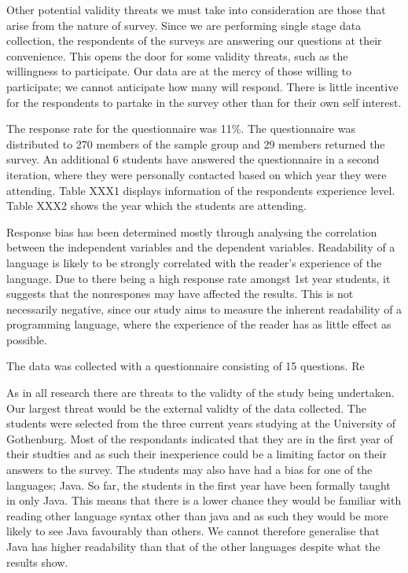\documentclass[times, 10pt,twocolumn]{IEEEtran}
\begin{document}
Other potential validity threats we must take into consideration are those that arise from the nature of survey. Since we are performing single stage data collection, the respondents of the surveys are answering our questions at their convenience. This opens the door for some validity threats, such as the willingness to participate. Our data are at the mercy of those willing to participate; we cannot anticipate how many will respond. There is little incentive for the respondents to partake in the survey other than for their own self interest.

The response rate for the questionnaire was 11\%. The questionnaire was distributed to 270 members of the sample group and 29 members returned the survey. An additional 6 students have answered the questionnaire in a second iteration, where they were personally contacted based on which year they were attending. Table XXX1 displays information of the respondents experience level. Table XXX2 shows the year which the students are attending. 
\newline

Response bias has been determined mostly through analysing the correlation between the independent variables and the dependent variables. Readability of a language is likely to be strongly correlated with the reader's experience of the language. Due to there being a high response rate amongst 1st year students, it suggests that the nonrespones may have affected the results. This is not necessarily negative, since our study aims to measure the inherent readability of a programming language, where the experience of the reader has as little effect as possible. 
\newline

The data was collected with a questionnaire consisting of 15 questions.
Re


As in all research there are threats to the validty of the study being undertaken. Our largest threat would be the external validty of the data collected. The students were selected from the three current years studying at the University of Gothenburg. Most of the respondants indicated that they are in the first year of their studties and as such their inexperience could be a limiting factor on their answers to the survey. The students may also have had a bias for one of the languages; Java. So far, the students in the first year have been formally taught in only Java. This means that there is a lower chance they would be familiar with reading other language syntax other than java and as such they would be more likely to see Java favourably than others. We cannot therefore generalise that Java has higher readability than that of the other languages despite what the results show. 
\end{document}
